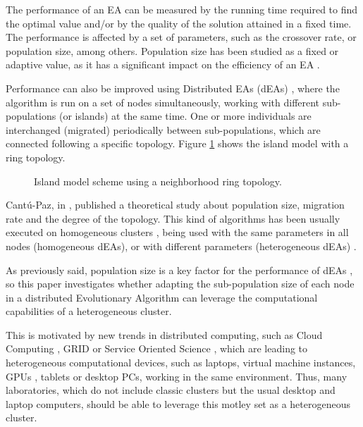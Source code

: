 \documentclass[final,1p,times]{elsarticle}
\begin{document}
The performance of an EA can be measured by the running time required to find the optimal value 
and/or by the quality of the solution attained in a fixed time. The performance is affected by a set 
of parameters, such as the crossover rate, or population size, among others. 
Population size has been studied as a fixed \cite{SizingHarik99} or adaptive 
\cite{SelfRegulatedSizeFernandes06,AdaptiveLobo07} value, as it has a significant impact on the efficiency of an EA \cite{ShrinkageLaredo09}.

Performance can also be improved using Distributed EAs (dEAs) \cite{MULTIKULTI}, where the algorithm is run on a set of nodes simultaneously,
working with different sub-populations (or islands) at the same
time. One or more individuals are
interchanged (migrated) periodically between sub-populations, which are connected
following a specific topology. Figure \ref{fig:islands} shows the island
model with a ring topology. 


\begin{figure}[htb]
\centering
{}
\caption{Island model scheme using a neighborhood ring topology.}
\label{fig:islands}
\end{figure}






Cant{\'u}-Paz, in \cite{CantuPazTopologies99}, published a theoretical study about population size, migration rate and the degree of the topology.  This kind of algorithms has been usually executed on homogeneous clusters \cite{MULTIKULTI,Wakunda97EVA}, being used with the same
parameters in all nodes (homogeneous dEAs), or with different
parameters (heterogeneous dEAs) \cite{garcia2014randomized,tanabe2013evaluation,HETEROGENEOUSPARAMETERS}. 



As previously said, population size is a key factor for the performance 
of dEAs \cite{ShrinkageLaredo09}, so this paper investigates whether
adapting the sub-population size of each node in a distributed
Evolutionary Algorithm can leverage the
computational capabilities of a heterogeneous cluster.                             

This is motivated by new trends in distributed computing, such as Cloud Computing \cite{Derby13Cloud}, GRID
\cite{OPENSCIENCEGRID} or Service Oriented Science \cite{GLOBUS}, which are
leading to heterogeneous computational devices, such as laptops,
virtual machine instances, 
GPUs \cite{Acosta13GPUs},
tablets or desktop PCs, working in the same
environment. Thus, many laboratories, which do not include classic
clusters but the usual desktop and laptop computers, should be able to leverage
this motley set as a heterogeneous cluster. 
\end{document}
